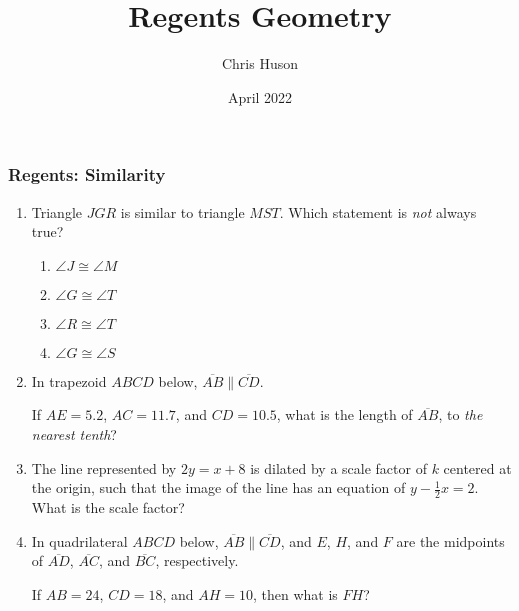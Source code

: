 \documentclass[12pt, oneside]{article}
\title{Regents Geometry}
\author{Chris Huson}
\date{April 2022}
\begin{document}
\subsubsection*{Regents: Similarity}
\begin{enumerate}[itemsep=1.7cm]
\item Triangle $JGR$ is similar to triangle $MST$. Which statement is \emph{not}
always true?
\begin{multicols}{2}
  \begin{enumerate}
    \item $\angle J \cong \angle M$
    \item $\angle G \cong \angle T$ 
    \item $\angle R \cong \angle T$
    \item $\angle G \cong \angle S$
  \end{enumerate}
\end{multicols}

\item In trapezoid $ABCD$ below, $\overline{AB} \parallel \overline{CD}$.
\begin{center}
  \end{center}
If $AE=5.2$, $AC=11.7$, and $CD=10.5$, what is the length of $\overline{AB}$, to \emph{the nearest tenth}?

\item The line represented by $2y=x+8$ is dilated by a scale factor
of $k$ centered at the origin, such that the image of the line has an
equation of $y - \frac{1}{2} x=2$. What is the scale factor?

\item In quadrilateral $ABCD$ below, $\overline{AB} \parallel \overline{CD}$, and $E$, $H$, and $F$ are the midpoints of $\overline{AD}$, $\overline{AC}$,  and $\overline{BC}$, respectively.
\begin{center}
  \end{center}
If $AB=24$, $CD=18$, and $AH=10$, then what is $FH$?


\end{enumerate}
\end{document}
